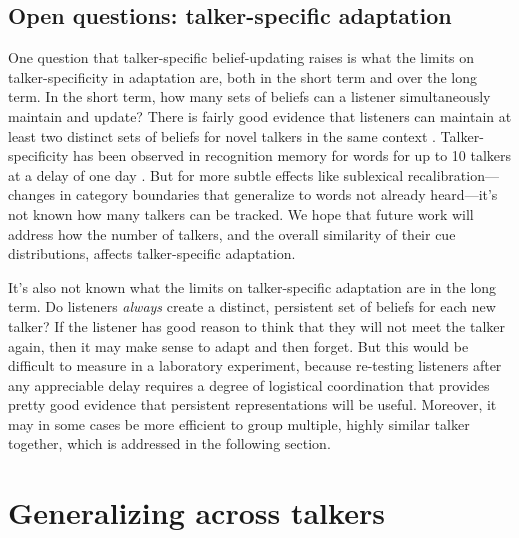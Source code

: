 \subsection{Open questions: talker-specific adaptation}
\label{sec:open-quest-talk-1}

One question that talker-specific belief-updating raises is what the limits on talker-specificity in adaptation are, both in the short term and over the long term.  In the short term, how many sets of beliefs can a listener simultaneously maintain and update?  There is fairly good evidence that listeners can maintain at least two distinct sets of beliefs for novel talkers in the same context \cite{Munson2011,Kraljic2007}.   Talker-specificity has been observed in recognition memory for words for up to 10 talkers at a delay of one day \cite{Goldinger1996}.  But for more subtle effects like sublexical recalibration---changes in category boundaries that generalize to words not already heard---it's not known how many talkers can be tracked.  We hope that future work will address how the number of talkers, and the overall similarity of their cue distributions, affects talker-specific adaptation.

It's also not known what the limits on talker-specific adaptation are in the long term. Do listeners \emph{always} create a distinct, persistent set of beliefs for each new talker?  If the listener has good reason to think that they will not meet the talker again, then it may make sense to adapt and then forget.  But this would be difficult to measure in a laboratory experiment, because re-testing listeners after any appreciable delay requires a degree of logistical coordination that provides pretty good evidence that persistent representations will be useful.  Moreover, it may in some cases be more efficient to group multiple, highly similar talker together, which is addressed in the following section.


\section{Generalizing across talkers}
\label{sec:gener-across-talk}



